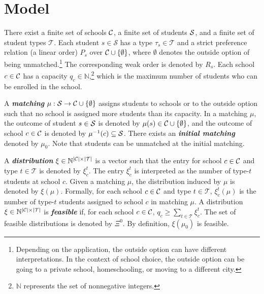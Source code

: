 \documentclass[12pt]{amsart}
\theoremstyle{remark}
\def\T{\mathcal{T}} \def\calt{\mathcal{T}}
\newcommand{\df}[1]{\textbf{\textit{#1}}}
\newcommand{\abs}[1]{\left| #1 \right|}
\begin{document}
\section{Model}\label{sec:model}
There exist a finite set of schools $\mathcal{C}$, a finite set of students $\mathcal{S}$,
and a finite set of student types $\calt$.
Each student $s\in \mathcal{S}$ has a type $\tau_s \in \calt$
and a strict preference relation (a linear order) $P_s$ over $\mathcal{C} \cup \{\emptyset\}$,
where $\emptyset$ denotes the outside
option of being unmatched.\footnote{Depending on the application, the outside
option can have different interpretations. In the context of school choice, the outside
option can be going to a private school, homeschooling, or moving to a different
city.} The corresponding weak order is denoted by $R_s$.
Each school $c \in \mathcal{C}$ has a capacity $q_c\in \mathbb{N}$,\footnote{$\mathbb{N}$ represents the set of nonnegative integers.}
which is the maximum number of students who can be enrolled in the school.

A \df{matching} $\mu : \mathcal{S} \rightarrow \mathcal{C} \cup \{\emptyset\}$ assigns students to schools
or to the outside option such that no school is assigned more students than its capacity.
In a matching $\mu$, the outcome of student $s\in \mathcal{S}$ is denoted by
$\mu(s)\in \mathcal{C} \cup \{\emptyset\}$,
and the outcome of school $c\in \mathcal{C}$ is denoted by $\mu^{-1}(c)\subseteq \mathcal{S}$. %
There exists an \df{initial matching} denoted by $\mu_0$. Note that students can be unmatched
at the initial matching. %

A \df{distribution} $\xi \in \mathbb N^{|\C|\times |\T|}$ is a vector such that the entry for school $c\in \mathcal{C}$ and type $t\in \calt$ is denoted by $\xi_c^t$. The entry
$\xi_c^t$ is interpreted as the number of type-$t$ students at school $c$. Given a
matching $\mu$, the distribution induced by $\mu$ is denoted by $\xi(\mu)$. Formally,
for each school $c\in \mathcal{C}$ and type $t\in \calt$, $\xi^t_c(\mu)$ is the
number of type-$t$ students assigned to school $c$ in matching $\mu$.
A distribution $\xi \in \mathbb N^{|\C|\times |\T|}$ is \df{feasible} if, for
each school $c\in \mathcal{C}$, $q_c \geq \sum_{t \in \calt} \xi_c^t$. The set of
feasible distributions is denoted by $\Xi^0$. By definition, $\xi(\mu_0)$ is feasible. %
\end{document}
